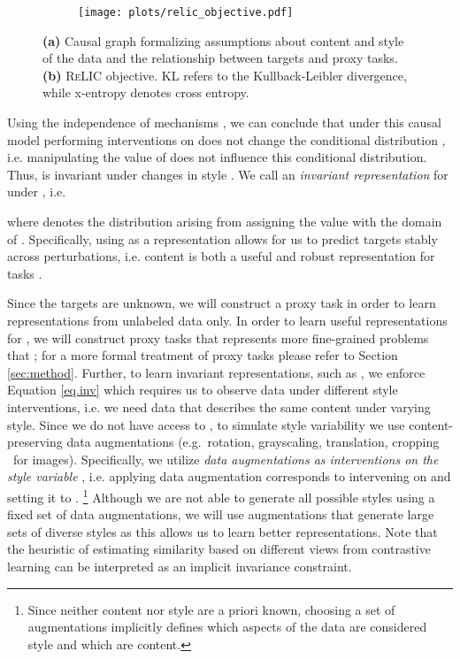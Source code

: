 \documentclass{article}
\newcommand{\relic}{\textsc{ReLIC}}
\begin{document}
\begin{figure}[t]
\begin{subfigure}[b]{.40\textwidth}
\caption{\label{fig.cgraph}}
\end{subfigure}
\begin{subfigure}[b]{.60\textwidth}
\texttt{[image: plots/relic\_objective.pdf]}
\caption{\label{fig.objective}}
\end{subfigure}
\caption{\textbf{(a)} Causal graph formalizing assumptions about content and style of the data and the relationship between targets and proxy tasks. \textbf{(b)} \relic{} objective. KL refers to the Kullback-Leibler divergence, while x-entropy denotes cross entropy.}
\end{figure}

Using the independence of mechanisms \citep{peters2017elements}, we can conclude that under this causal model performing interventions on  does not change the conditional distribution , 
i.e. manipulating the value of  does not influence this conditional distribution.
Thus,  is invariant under changes in style .
We call  an \emph{invariant representation} for  under , i.e.

where  denotes the distribution arising from assigning  the value  with  the domain of  \citep{pearl2009causality}.
Specifically, using  as a representation allows for us to predict targets stably across perturbations, i.e. content  is both a useful and robust representation for tasks .

Since the targets  are unknown, we will construct a proxy task  in order to learn representations from unlabeled data  only.
In order to learn useful representations for , we will construct proxy tasks that represents more fine-grained problems that ; for a more formal treatment of proxy tasks please refer to Section \ref{sec:method}.
Further, to learn invariant representations, such as , we enforce Equation \ref{eq.inv} which requires us to observe data under different style interventions, i.e. we need data that describes the same content under varying style. 
Since we do not have access to , to simulate style variability we use content-preserving data augmentations  (e.g.\ rotation, grayscaling, translation, cropping \ for images).
Specifically, we utilize \emph{data augmentations as interventions on the style variable }, i.e. applying data augmentation  corresponds to intervening on  and setting it to . \footnote{Since neither content nor style are a priori known, choosing a set of augmentations implicitly defines which aspects of the data are considered style and which are content.}
Although we are not able to generate all possible styles using a fixed set of data augmentations, we will use augmentations that generate large sets of diverse styles as this allows us to learn better representations. 
Note that the heuristic of estimating similarity based on different views from contrastive learning can be interpreted as an implicit invariance constraint.
\end{document}

